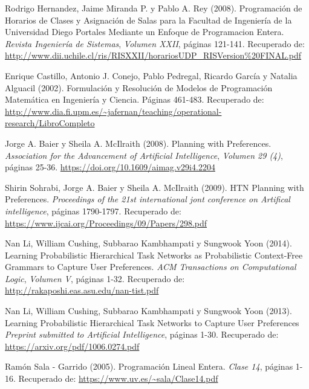 \documentclass[a4paper]{article}
\begin{document}
\begin{thebibliography}{X}
 Rodrigo Hernandez, Jaime Miranda P. y Pablo A. Rey (2008). Programación de Horarios de Clases y Asignación de Salas para la Facultad de Ingeniería de la Universidad Diego Portales Mediante un Enfoque de Programacion Entera. \textit{Revista Ingeniería de Sistemas}, \textit{Volumen XXII}, páginas 121-141.
Recuperado de: \url{http://www.dii.uchile.cl/ris/RISXXII/horariosUDP_RISVersion%20FINAL.pdf}


Enrique Castillo, Antonio J. Conejo, Pablo Pedregal, Ricardo García y Natalia Alguacil (2002). Formulación y Resolución de Modelos de Programación Matemática en Ingeniería y Ciencia. Páginas 461-483.
Recuperado de: \url{http://www.dia.fi.upm.es/~jafernan/teaching/operational-research/LibroCompleto}


Jorge A. Baier y Sheila A. McIlraith (2008). Planning with Preferences. \textit{Association for the Advancement of Artificial Intelligence}, \textit{Volumen 29 (4)}, páginas 25-36.
\url{https://doi.org/10.1609/aimag.v29i4.2204}


Shirin Sohrabi, Jorge A. Baier y Sheila A. McIlraith (2009). HTN Planning with Preferences. \textit{Proceedings of the 21st international jont conference on Artifical intelligence},  páginas 1790-1797.
Recuperado de: \url{https://www.ijcai.org/Proceedings/09/Papers/298.pdf}


 Nan Li, William Cushing, Subbarao Kambhampati y Sungwook Yoon (2014). Learning Probabilistic Hierarchical Task Networks as Probabilistic Context-Free Grammars to Capture User Preferences. \textit{ACM Transactions on Computational Logic}, \textit{Volumen V}, páginas 1-32.
Recuperado de: \url{http://rakaposhi.eas.asu.edu/nan-tist.pdf}


 Nan Li, William Cushing, Subbarao Kambhampati y Sungwook Yoon (2013). Learning Probabilistic Hierarchical Task Networks to Capture User Preferences \textit{Preprint submitted to Artificial Intelligence}, páginas 1-30.
Recuperado de: \url{https://arxiv.org/pdf/1006.0274.pdf}


 Ramón Sala - Garrido (2005). Programación Lineal Entera. \textit{Clase 14}, páginas 1-16.
Recuperado de: \url{https://www.uv.es/~sala/Clase14.pdf}



\end{thebibliography}
\end{document}
